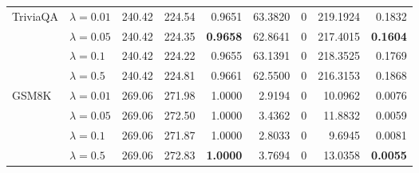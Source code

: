 \begin{table}[t]
{\begin{tabular}{l l rrrrrrr}
\midrule
TriviaQA & $\lambda{=}0.01$ & 240.42 & 224.54 & 0.9651 & 63.3820 & \cellcolor{cyan!12} $0$ & 219.1924 & 0.1832 \\
 & $\lambda{=}0.05$ & 240.42 & 224.35 & \textbf{0.9658} & 62.8641 & \cellcolor{cyan!12} $0$ & 217.4015 & \textbf{0.1604} \\
 & $\lambda{=}0.1$ & 240.42 & 224.22 & 0.9655 & 63.1391 & \cellcolor{cyan!12} $0$ & 218.3525 & 0.1769 \\
 & $\lambda{=}0.5$ & 240.42 & 224.81 & 0.9661 & 62.5500 & \cellcolor{cyan!12} $0$ & 216.3153 & 0.1868 \\
\midrule
GSM8K & $\lambda{=}0.01$ & 269.06 & 271.98 & 1.0000 & 2.9194 & \cellcolor{cyan!12} $0$ & 10.0962 & 0.0076 \\
 & $\lambda{=}0.05$ & 269.06 & 272.50 & 1.0000 & 3.4362 & \cellcolor{cyan!12} $0$ & 11.8832 & 0.0059 \\
 & $\lambda{=}0.1$ & 269.06 & 271.87 & 1.0000 & 2.8033 & \cellcolor{cyan!12} $0$ & 9.6945 & 0.0081 \\
 & $\lambda{=}0.5$ & 269.06 & 272.83 & \textbf{1.0000} & 3.7694 & \cellcolor{cyan!12} $0$ & 13.0358 & \textbf{0.0055} \\
\bottomrule
\end{tabular}}
\end{table}